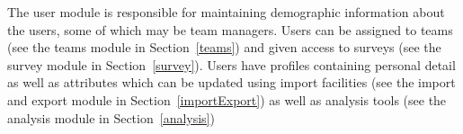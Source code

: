The user module is responsible for maintaining demographic information about the users, some of which may be team managers. Users can be assigned to teams (see the teams module in Section~\ref{teams}) and  given access to surveys (see the survey module in Section~\ref{survey}). Users have profiles containing personal detail as well as attributes which can be updated using import facilities (see the import and export module in Section~\ref{importExport}) as well as analysis tools (see the analysis module in Section~\ref{analysis})